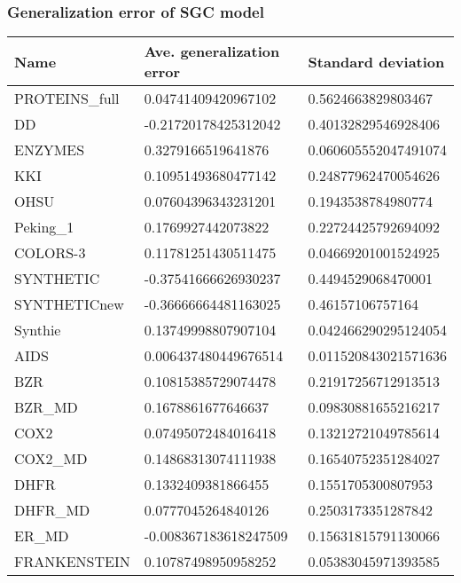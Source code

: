 \documentclass{article}
\begin{document}
\newpage

\subsubsection{Generalization error of SGC model}
\begin{table}[!ht]
    \centering
    \begin{tabular}{|l|l|l|}
    \hline
        Name & Ave. generalization error & Standard deviation \\ \hline
        PROTEINS\_full & 0.04741409420967102 & 0.5624663829803467 \\ \hline
        DD & -0.21720178425312042 & 0.40132829546928406 \\ \hline
        ENZYMES & 0.3279166519641876 & 0.060605552047491074 \\ \hline
        KKI & 0.10951493680477142 & 0.24877962470054626 \\ \hline
        OHSU & 0.07604396343231201 & 0.1943538784980774 \\ \hline
        Peking\_1 & 0.1769927442073822 & 0.22724425792694092 \\ \hline
        COLORS-3 & 0.11781251430511475 & 0.04669201001524925 \\ \hline
        SYNTHETIC & -0.37541666626930237 & 0.4494529068470001 \\ \hline
        SYNTHETICnew & -0.36666664481163025 & 0.46157106757164 \\ \hline
        Synthie & 0.13749998807907104 & 0.042466290295124054 \\ \hline
        AIDS & 0.006437480449676514 & 0.011520843021571636 \\ \hline
        BZR & 0.10815385729074478 & 0.21917256712913513 \\ \hline
        BZR\_MD & 0.1678861677646637 & 0.09830881655216217 \\ \hline
        COX2 & 0.07495072484016418 & 0.13212721049785614 \\ \hline
        COX2\_MD & 0.14868313074111938 & 0.16540752351284027 \\ \hline
        DHFR & 0.1332409381866455 & 0.1551705300807953 \\ \hline
        DHFR\_MD & 0.0777045264840126 & 0.2503173351287842 \\ \hline
        ER\_MD & -0.008367183618247509 & 0.15631815791130066 \\ \hline
        FRANKENSTEIN & 0.10787498950958252 & 0.05383045971393585 \\ \hline

\end{tabular}
\end{table}
\end{document}
